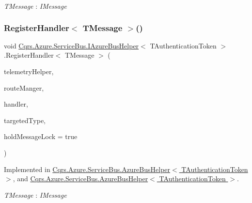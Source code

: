\begin{Desc}
\item[Type Constraints]\begin{description}
\item[{\em T\+Message} : {\em I\+Message}]\end{description}
\end{Desc}
\mbox{\label{interfaceCqrs_1_1Azure_1_1ServiceBus_1_1IAzureBusHelper_a1fe0ff74b4e5cce3d0b5a81dbaa273e0_a1fe0ff74b4e5cce3d0b5a81dbaa273e0}} 
\subsubsection{\texorpdfstring{Register\+Handler$<$ T\+Message $>$()}{RegisterHandler< TMessage >()}}
{\footnotesize\ttfamily void \hyperlink{interfaceCqrs_1_1Azure_1_1ServiceBus_1_1IAzureBusHelper}{Cqrs.\+Azure.\+Service\+Bus.\+I\+Azure\+Bus\+Helper}$<$ T\+Authentication\+Token $>$.Register\+Handler$<$ T\+Message $>$ (\begin{DoxyParamCaption}\item[{I\+Telemetry\+Helper}]{telemetry\+Helper,  }\item[{\hyperlink{classCqrs_1_1Bus_1_1RouteManager}{Route\+Manager}}]{route\+Manger,  }\item[{Action$<$ T\+Message $>$}]{handler,  }\item[{Type}]{targeted\+Type,  }\item[{bool}]{hold\+Message\+Lock = {\ttfamily true} }\end{DoxyParamCaption})}



Implemented in \hyperlink{classCqrs_1_1Azure_1_1ServiceBus_1_1AzureBusHelper_a3b8dd8410756ffdc67782dde8f2519ff_a3b8dd8410756ffdc67782dde8f2519ff}{Cqrs.\+Azure.\+Service\+Bus.\+Azure\+Bus\+Helper$<$ T\+Authentication\+Token $>$}, and \hyperlink{classCqrs_1_1Azure_1_1ServiceBus_1_1AzureBusHelper_a3b8dd8410756ffdc67782dde8f2519ff_a3b8dd8410756ffdc67782dde8f2519ff}{Cqrs.\+Azure.\+Service\+Bus.\+Azure\+Bus\+Helper$<$ T\+Authentication\+Token $>$}.

\begin{Desc}
\item[Type Constraints]\begin{description}
\item[{\em T\+Message} : {\em I\+Message}]\end{description}
\end{Desc}
